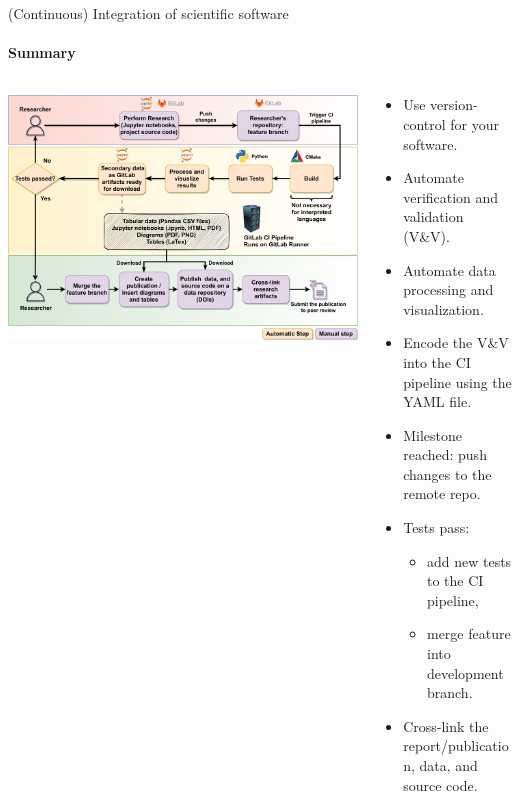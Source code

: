 \begin{frame}{(Continuous) Integration of scientific software} 
    \framesubtitle{Summary}

\begin{columns}
    \begin{column}[c]{0.49\textwidth}
        \centering
        \includegraphics[width=\columnwidth]{figures/ZINF-CI-diagram-individual.pdf}
    \end{column}
    \begin{column}[c]{0.49\textwidth}
        \begin{itemize} 
            \item Use version-control for your software.  
            \item Automate verification and validation (V\&V). 
            \item Automate data processing and visualization.
            \item Encode the V\&V into the CI pipeline using the YAML file.
            \item Milestone reached: push changes to the remote repo. 
            \item Tests pass: 
                \begin{itemize} 
                    \item add new tests to the CI pipeline, 
                    \item merge feature into development branch. 
                \end{itemize}
            \item Cross-link the report/publication, data, and source code.
        \end{itemize}
    \end{column}
\end{columns}

\end{frame}

